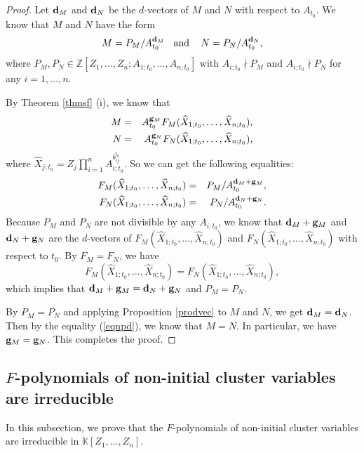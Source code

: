 \documentclass{amsart}
\theoremstyle{definition}
\theoremstyle{remark}
\numberwithin{equation}{section}
\begin{document}
\begin{proof}
Let ${\bf d}_M$ and ${\bf d}_N$ be the $d$-vectors of $M$ and $N$ with respect to $A_{t_0}$. We know that $M$ and $N$ have the form
\begin{eqnarray}\label{eqnpd}
M=P_M/A_{t_0}^{{\bf d}_M}\;\;\text{ and }\;\;\;N=P_N/A_{t_0}^{{\bf d}_N},
\end{eqnarray}
where $P_M,P_N\in\mathbb Z[Z_1,\ldots,Z_n;A_{1;t_0},\ldots,A_{n;t_0}]$ with $A_{i;t_0}\nmid P_M$ and $A_{i;t_0}\nmid P_N$ for any $i=1,\ldots,n$.

By Theorem \ref{thmsf} (i), we know that
\begin{eqnarray}
M&=&A_{t_0}^{{\bf g}_M}F_M(\widehat X_{1;t_0},\ldots,\widehat X_{n;t_0}),\nonumber\\
N&=&A_{t_0}^{{\bf g}_N}F_N(\widehat X_{1;t_0},\ldots,\widehat X_{n;t_0}),\nonumber
\end{eqnarray}
where $\widehat X_{j;t_0}=Z_j\prod\limits_{i=1}^nA_{i;t_0}^{b_{ij}^{t_0}}$.
So we can get the following equalities:
\begin{eqnarray}
F_M(\widehat X_{1;t_0},\ldots,\widehat X_{n;t_0})&=&P_M/A_{t_0}^{{\bf d}_M+{\bf g}_M},\nonumber\\
F_N(\widehat X_{1;t_0},\ldots,\widehat X_{n;t_0})&=&P_N/A_{t_0}^{{\bf d}_N+{\bf g}_N}.\nonumber
\end{eqnarray}
Because $P_M$ and $P_N$ are not divisible by any $A_{i;t_0}$, we know that ${\bf d}_M+{\bf g}_M$ and ${\bf d}_N+{\bf g}_N$ are the $d$-vectors of $F_M(\widehat X_{1;t_0},\ldots,\widehat X_{n;t_0})$ and $F_N(\widehat X_{1;t_0},\ldots,\widehat X_{n;t_0})$ with respect to $t_0$. By $F_M=F_N$, we have $$F_M(\widehat X_{1;t_0},\ldots,\widehat X_{n;t_0})=F_N(\widehat X_{1;t_0},\ldots,\widehat X_{n;t_0}),$$ which implies that ${\bf d}_M+{\bf g}_M={\bf d}_N+{\bf g}_N$ and $P_M=P_N$.

By $P_M=P_N$ and applying Proposition \ref{prodvec} to $M$ and $N$, we get ${\bf d}_M={\bf d}_N$. Then by the equality (\ref{eqnpd}), we know that $M=N$. In particular, we have ${\bf g}_M={\bf g}_N$. This completes the proof.
\end{proof}








\subsection{\texorpdfstring{$F$}{Lg}-polynomials of non-initial cluster variables are irreducible}\label{sec62}
 In this subsection, we prove that the $F$-polynomials of non-initial cluster variables are  irreducible in $\mathbb K[Z_1,\ldots,Z_n]$.
\end{document}
